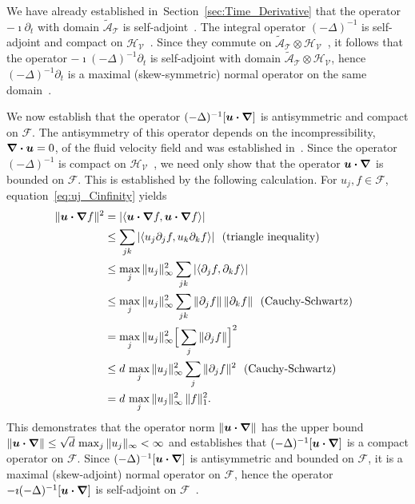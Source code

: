 \documentclass[leqno,onefignum,onetabnum]{siamltex1213}
\newcommand{\secref}[1]{Section~\ref{#1}}
\newcommand{\Tc}{\mathcal{T}}
\newcommand{\Vc}{\mathcal{V}}
\newcommand{\Hs}{\mathscr{H}}
\newcommand{\As}{\mathscr{A}}
\newcommand{\Fs}{\mathscr{F}}
\newcommand\bnabla{\mbox{\boldmath${\nabla}$}}
\providecommand\bcdot{\boldsymbol{\cdot}}
\newcommand{\vecu}{\boldsymbol{u}}
\begin{document}
We have already established in~\secref{sec:Time_Derivative} that the
operator $-\imath\partial_t$ with domain $\tilde{\As}_{\Tc}$ is
self-adjoint~\cite{Stone:64}. The integral operator $(-\Delta)^{-1}$ 
is self-adjoint and compact on
$\Hs_{\Vc}$~\cite{Stakgold:BVP:2000}. Since they commute on
$\tilde{\As}_{\Tc}\otimes\Hs_{\Vc}$~\cite{Folland:99:RealAnalysis}, it 
follows that the operator $-\imath(-\Delta)^{-1}\partial_t$ is self-adjoint with domain
$\tilde{\As}_{\Tc}\otimes\Hs_{\Vc}$, hence $(-\Delta)^{-1}\partial_t$ is a maximal
(skew-symmetric) normal operator on the same domain~\cite{Stone:64}.




We now establish that the operator $(-\Delta)^{-1}[\vecu\bcdot\bnabla]$
is antisymmetric and compact on $\Fs$. The antisymmetry of this
operator depends on the incompressibility, $\bnabla\bcdot\vecu=0$, of
the fluid velocity field and was established
in~\cite{Bhattacharya:AAP:1999:951,Pavliotis:PHD_Thesis}. 
Since the operator $(-\Delta)^{-1}$ is compact on
$\Hs_{\Vc}$~\cite{Stakgold:BVP:2000}, we need only show that the
operator $\vecu\bcdot\bnabla$ is bounded on $\Fs$. This is established
by the following calculation. For $u_j,f\in\Fs$,
equation~\eqref{eq:uj_Cinfinity}  yields 
%
\begin{align}\label{eq:Second_Bound_A}
  \|\vecu\bcdot\bnabla f\|^2&=|\langle\vecu\bcdot\bnabla f,\vecu\bcdot\bnabla f\rangle| 
         \\
         &\leq\sum_{jk}|\langle u_j\partial_jf,u_k\partial_kf\rangle |~\text{ (triangle inequality) }
         \notag\\
         &\leq\max_j\|u_j\|_\infty^2\sum_{jk}|\langle\partial_jf,\partial_kf\rangle|
         \notag\\
         &\leq\max_j\|u_j\|_\infty^2\sum_{jk}\|\partial_jf\|\,\|\partial_kf\|
              ~\text{ (Cauchy-Schwartz) }~
         \notag\\
         &=\max_j\|u_j\|_\infty^2\Big[\sum_{j}\|\partial_jf\|\Big]^2
         \notag\\
         &\leq d\,\max_j\|u_j\|_\infty^2\sum_{j}\|\partial_jf\|^2
         ~\text{ (Cauchy-Schwartz) }~
         \notag\\
         &=d\,\max_j\|u_j\|_\infty^2\,\|f\|_1^2.
         \notag
\end{align}
%
This demonstrates that the operator norm $\|\vecu\bcdot\bnabla\|$ has
the upper bound $\|\vecu\bcdot\bnabla\|\leq\sqrt{d}\,\max_j\|u_j\|_\infty<\infty$ and
establishes that $(-\Delta)^{-1}[\vecu\bcdot\bnabla]$ is a compact operator
on $\Fs$. Since $(-\Delta)^{-1}[\vecu\bcdot\bnabla]$ is
antisymmetric and bounded on $\Fs$, it is a maximal (skew-adjoint)
normal operator on $\Fs$, hence the operator
$-\imath(-\Delta)^{-1}[\vecu\bcdot\bnabla]$ is self-adjoint on
$\Fs$~\cite{Stone:64}.  
\end{document}
